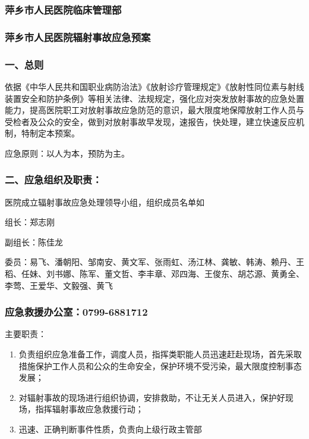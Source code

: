 \subsubsection{萍乡市人民医院临床管理部}

\subsubsection{萍乡市人民医院辐射事故应急预案}

\subsubsection{一、总则}

依据《中华人民共和国职业病防治法》《放射诊疗管理规定》《放射性同位素与射线装置安全和防护条例》等相关法律、法规规定，强化应对突发放射事故的应急处置能力，提高医院职工对放射事故应急防范的意识，最大限度地保障放射工作人员与受检者及公众的安全，做到对放射事故早发现，速报告，快处理，建立快速反应机制，特制定本预案。

应急原则：以人为本，预防为主。

\subsubsection{二、应急组织及职责：}

医院成立辐射事故应急处理领导小组，组织成员名单如

组长：郑志刚

副组长：陈佳龙

委员：易飞、潘朝阳、邹南安、黄文军、张雨虹、汤江林、龚敏、韩涛、赖丹、王稻、任妹、刘书娜、陈军、董文哲、李丰章、邓四海、王俊东、胡芯源、黄勇全、李莺、王爱华、文毅强、黄飞

\subsubsection{应急救援办公室：0799-6881712}

主要职责：

\begin{enumerate}
\item 负责组织应急准备工作，调度人员，指挥类职能人员迅速赶赴现场，首先采取措施保护工作人员和公众的生命安全，保护环境不受污染，最大限度控制事态发展；
\item 对辐射事故的现场进行组织协调，安排救助，不让无关人员进入，保护好现场，指挥辐射事故应急救援行动；
\item 迅速、正确判断事件性质，负责向上级行政主管部
\end{enumerate}

